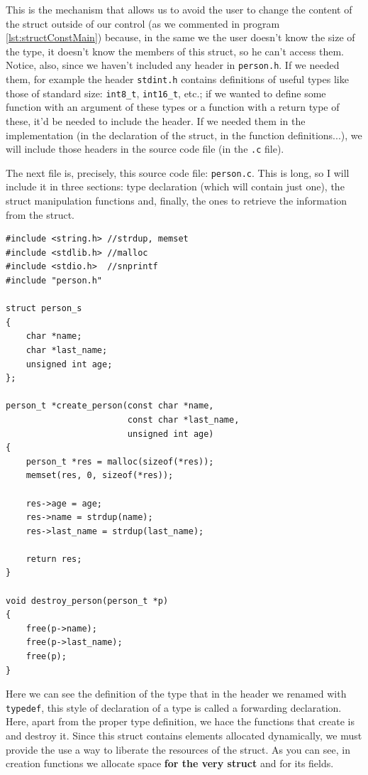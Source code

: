 \documentclass[a4paper]{article}
\begin{document}
This is the mechanism that allows us to avoid the user to change the content of
the struct outside of our control (as we commented in program
\ref{lst:structConstMain}) because, in the same we the user doesn't know the
size of the type, it doesn't know the members of this struct, so he can't
access them. Notice, also, since we haven't included any header in
\verb!person.h!. If we needed them, for example the header \verb!stdint.h!
contains definitions of useful types like those of standard size: \verb!int8_t!,
\verb!int16_t!, etc.; if we wanted to define some function with an argument of
these types or a function with a return type of these, it'd be needed to
include the header. If we needed them in the implementation (in the declaration
of the struct, in the function definitions...), we will include those headers
in the source code file (in the \verb!.c! file).

The next file is, precisely, this source code file: \verb!person.c!. This is
long, so I will include it in three sections: type declaration (which will
contain just one), the struct manipulation functions and, finally, the ones
to retrieve the information from the struct.

\noindent
\begin{minipage}[H]{\linewidth}
\mbox{}
\begin{lstlisting}[style=C, label={lst:finalExDefinition},
caption={Final example of program -- \texttt{person.c} definitions}]
#include <string.h> //strdup, memset
#include <stdlib.h> //malloc
#include <stdio.h>  //snprintf
#include "person.h"

struct person_s
{
    char *name;
    char *last_name;
    unsigned int age;
};

person_t *create_person(const char *name,
                        const char *last_name,
                        unsigned int age)
{
    person_t *res = malloc(sizeof(*res));
    memset(res, 0, sizeof(*res));

    res->age = age;
    res->name = strdup(name);
    res->last_name = strdup(last_name);

    return res;
}

void destroy_person(person_t *p)
{
    free(p->name);
    free(p->last_name);
    free(p);
}
\end{lstlisting}
\end{minipage}

Here we can see the definition of the type that in the header we renamed with
\verb!typedef!, this style of declaration of a type is called a forwarding
declaration. Here, apart from the proper type definition, we hace the functions
that create is and destroy it. Since this struct contains elements allocated
dynamically, we must provide the use a way to liberate the resources of the
struct. As you can see, in creation functions we allocate space
\textbf{for the very struct} and for its fields.
\end{document}

